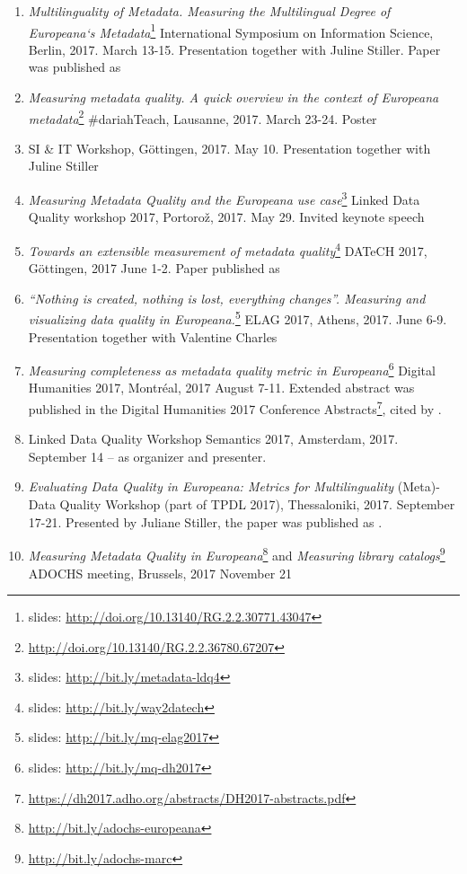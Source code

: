 \begin{enumerate}
  \setlength{\parskip}{0pt}
  \setlength{\itemsep}{0pt plus 1pt}
\item \emph{Multilinguality of Metadata. Measuring the Multilingual Degree of Europeana‘s Metadata}\footnote{slides: \url{http://doi.org/10.13140/RG.2.2.30771.43047}} International Symposium on Information Science, Berlin, 2017. March 13-15. Presentation together with Juline Stiller. Paper was published as \cite{stiller-kiraly2017}
\item \emph{Measuring metadata quality. A quick overview in the context of Europeana metadata}\footnote{\url{http://doi.org/10.13140/RG.2.2.36780.67207}} \#dariahTeach, Lausanne, 2017. March 23-24. Poster
\item SI \& IT Workshop, Göttingen, 2017. May 10. Presentation together with Juline Stiller
\item \emph{Measuring Metadata Quality and the Europeana use case}\footnote{slides: \url{http://bit.ly/metadata-ldq4}} Linked Data Quality workshop 2017, Portorož, 2017. May 29. Invited keynote speech
\item \emph{Towards an extensible measurement of metadata quality}\footnote{slides: \url{http://bit.ly/way2datech}} DATeCH 2017, Göttingen, 2017 June 1-2. Paper published as \cite{kiraly2017}
\item \emph{``Nothing is created, nothing is lost, everything changes''. Measuring and visualizing data quality in Europeana.}\footnote{slides: \url{http://bit.ly/mq-elag2017}} ELAG 2017, Athens, 2017. June 6-9. Presentation together with Valentine Charles
\item \emph{Measuring completeness as metadata quality metric in Europeana}\footnote{slides: \url{http://bit.ly/mq-dh2017}} Digital Humanities 2017, Montréal, 2017 August 7-11. Extended abstract was published in the Digital Humanities 2017 Conference Abstracts\footnote{\url{https://dh2017.adho.org/abstracts/DH2017-abstracts.pdf}}, cited by \cite{khan2018}.
\item Linked Data Quality Workshop Semantics 2017, Amsterdam, 2017. September 14 -- as organizer and presenter.
\item \emph{Evaluating Data Quality in Europeana: Metrics for Multilinguality} (Meta)-Data Quality Workshop (part of TPDL 2017), Thessaloniki, 2017. September 17-21. Presented by Juliane Stiller, the paper was published as \cite{charles2017}.
\item \emph{Measuring Metadata Quality in Europeana}\footnote{\url{http://bit.ly/adochs-europeana}} and \emph{Measuring library catalogs}\footnote{\url{http://bit.ly/adochs-marc}} ADOCHS meeting, Brussels, 2017 November 21

\end{enumerate}
